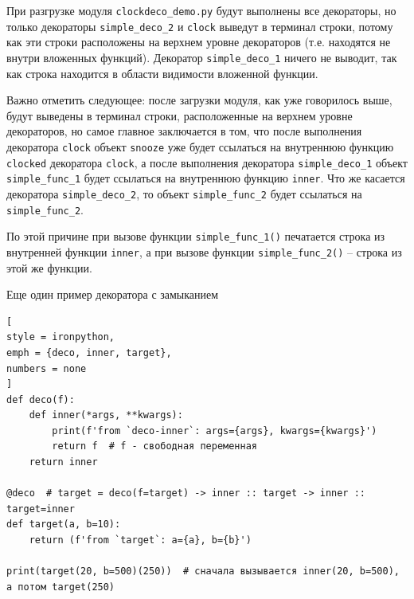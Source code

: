 \documentclass[%
	11pt,
	a4paper,
	utf8,
		]{article}
\begin{document}


При разгрузке модуля \texttt{clockdeco\_demo.py} будут выполнены все декораторы, но только декораторы \texttt{simple\_deco\_2} и \texttt{clock} выведут в терминал строки, потому как эти строки расположены на верхнем уровне декораторов (т.е. находятся не внутри вложенных функций). Декоратор \texttt{simple\_deco\_1} ничего не выводит, так как строка находится в области видимости вложенной функции.

Важно отметить следующее: после загрузки модуля, как уже говорилось выше, будут выведены в терминал строки, расположенные на верхнем уровне декораторов, но самое главное заключается в том, что после выполнения декоратора \texttt{clock} объект \texttt{snooze} уже будет ссылаться на внутреннюю функцию \texttt{clocked} декоратора \texttt{clock}, а после выполнения декоратора \texttt{simple\_deco\_1} объект \texttt{simple\_func\_1} будет ссылаться на внутреннюю функцию \texttt{inner}. Что же касается декоратора \texttt{simple\_deco\_2}, то объект \texttt{simple\_func\_2} будет ссылаться на \texttt{simple\_func\_2}.

По этой причине при вызове функции \texttt{simple\_func\_1()} печатается строка из внутренней функции \texttt{inner}, а при вызове функции \texttt{simple\_func\_2()} -- строка из этой же функции.

Еще один пример декоратора с замыканием

\begin{lstlisting}[
style = ironpython,
emph = {deco, inner, target},
numbers = none
]
def deco(f):
    def inner(*args, **kwargs):
        print(f'from `deco-inner`: args={args}, kwargs={kwargs}')
        return f  # f - свободная переменная
    return inner

@deco  # target = deco(f=target) -> inner :: target -> inner :: target=inner
def target(a, b=10):
    return (f'from `target`: a={a}, b={b}')

print(target(20, b=500)(250))  # сначала вызывается inner(20, b=500), а потом target(250)
\end{lstlisting}
\end{document}

